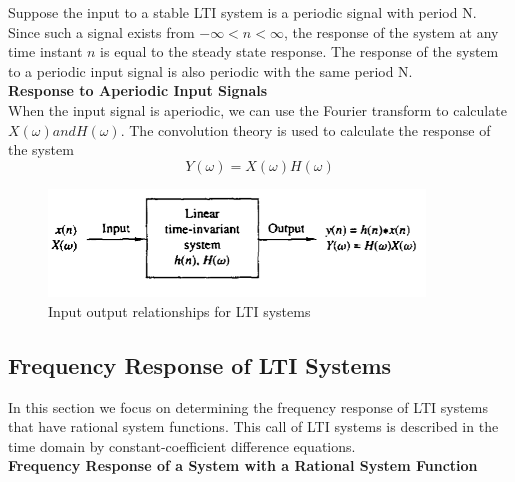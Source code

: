 \documentclass{article} %
\begin{document}
	Suppose the input to a stable LTI system is a periodic signal with period N. Since such a signal exists from $-\infty < n < \infty$, the response of the system at any time instant $n$ is equal to the steady state response. The response of the system to a periodic input signal is also periodic with the same period N. \\
	\textbf{Response to Aperiodic Input Signals}\\
	
	When the input signal is aperiodic, we can use the Fourier transform to calculate $X(\omega) and H(\omega)$. The convolution theory is used to calculate the response of the system
	\begin{equation}
	Y(\omega) = X(\omega)H(\omega)
	\end{equation}
	
	\begin{figure}[h]
	\centering
	\includegraphics[width=10cm]{conv_lti}
	\caption{Input output relationships for LTI systems}
	\end{figure}
	\subsection{Frequency Response of LTI Systems}
	In this section we focus on determining the frequency response of LTI systems that have rational system functions. This call of LTI systems is described in the time domain by constant-coefficient difference equations.\\
	\textbf{Frequency Response of a System with a Rational System Function}\\
	
\end{document}
